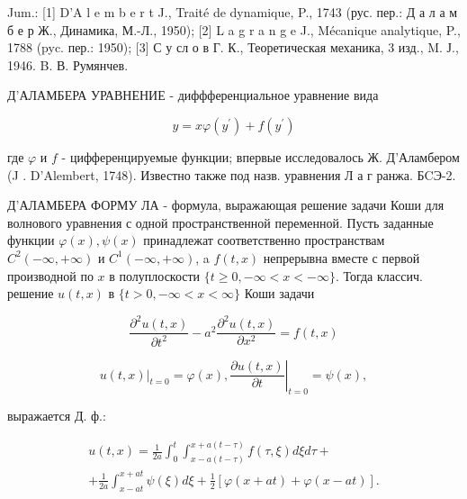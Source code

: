 \documentclass[10pt]{article}
\begin{document}
Jum.: [1] D'A l e m b e r t J., Traité de dynamique, P., 1743 (рус. пер.: Д а л а м б е р Ж., Динамика, М.-Л., 1950); [2] L a g r a n g e J., Mécanique analytique, P., 1788 (pyc. пер.: 1950); [3] С у сл о в Г. К., Теоретическая механика, 3 изд., M. Ј., 1946. B. В. Румянчев.



Д'АЛАМБЕРА УРАВНЕНИЕ - диффференциальное уравнение вида



\[

y=x \varphi\left(y^{\prime}\right)+f\left(y^{\prime}\right)

\]



где $\varphi$ и $f$ - цифференцируемые функции; впервые исследовалось Ж. Д'Аламбером (J . D'Alembert, 1748). Известно также под назв. уравнения Л а г ранжа. БCЭ-2.



Д'АЛАМБЕРА ФОРМУ ЛА - формула, выражающая решение задачи Коши для волнового уравнения с одной пространственной переменной. Пусть заданные функции $\varphi(x), \psi(x)$ принадлежат соответственно пространствам $C^{2}(-\infty,+\infty)$ и $C^{1}(-\infty,+\infty)$, a $f(t, x)$ непрерывна вместе с первой производной по $x$ в полуплоскости $\{t \geqslant 0,-\infty<x<-\infty\}$. Тогда классич. решение $u(t, x)$ в $\{t>0,-\infty<x<\infty\}$ Коши задачи



\[

\frac{\partial^{2} u(t, x)}{\partial t^{2}}-a^{2} \frac{\partial^{2} u(t, x)}{\partial x^{2}}=f(t, x)

\]



\[

\left.u(t, x)\right|_{t=0}=\varphi(x),\left.\frac{\partial u(t, x)}{\partial t}\right|_{t=0}=\psi(x),

\]



выражается Д. ф.:



\[

\begin{gathered}

u(t, x)=\frac{1}{2 a} \int_{0}^{t} \int_{x-a(t-\tau)}^{x+a(t-\tau)} f(\tau, \xi) d \xi d \tau+ \\

+\frac{1}{2 a} \int_{x-a t}^{x+a t} \psi(\xi) d \xi+\frac{1}{2}[\varphi(x+a t)+\varphi(x-a t)] .

\end{gathered}

\]
\end{document}

